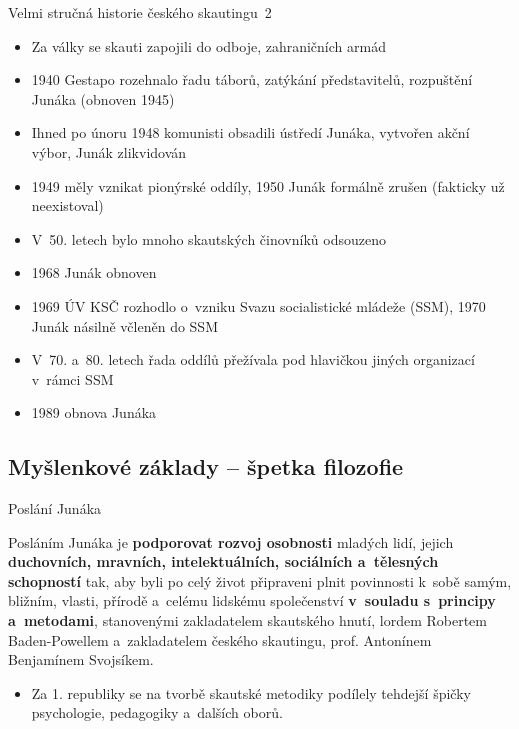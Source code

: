 \documentclass[compress,xelatex,xcolor=dvipsnames,print]{beamer}
\begin{document}
\begin{frame}{Velmi stručná historie českého skautingu~2}
\begin{itemize}
 \item Za války se skauti zapojili do odboje, zahraničních armád
 \item 1940 Gestapo rozehnalo řadu táborů, zatýkání představitelů, rozpuštění Junáka (obnoven 1945)
 \item Ihned po únoru 1948 komunisti obsadili ústředí Junáka, vytvořen akční výbor, Junák zlikvidován
 \item 1949 měly vznikat pionýrské oddíly, 1950 Junák formálně zrušen (fakticky už neexistoval)
 \item V~50. letech bylo mnoho skautských činovníků odsouzeno
 \item 1968 Junák obnoven
 \item 1969 ÚV KSČ rozhodlo o~vzniku Svazu socialistické mládeže (SSM), 1970 Junák násilně včleněn do SSM
 \item V~70. a~80. letech řada oddílů přežívala pod hlavičkou jiných organizací v~rámci SSM
 \item 1989 obnova Junáka
\end{itemize}
\end{frame}

\subsection{Myšlenkové základy -- špetka filozofie}

\begin{frame}{Poslání Junáka}
\begin{center}
\begin{Large}
Posláním Junáka je \textbf{podporovat rozvoj osobnosti} mladých lidí, jejich \textbf{duchovních, mravních, intelektuálních, sociálních a~tělesných schopností} tak, aby byli po celý život připraveni plnit povinnosti k~sobě samým, bližním, vlasti, přírodě a~celému lidskému společenství \textbf{v~souladu s~principy a~metodami}, stanovenými zakladatelem skautského hnutí, lordem Robertem Baden-Powellem a~zakladatelem českého skautingu, prof. Antonínem Benjamínem Svojsíkem.
\end{Large}
\end{center}
\begin{itemize}
\item Za 1. republiky se na tvorbě skautské metodiky podílely tehdejší špičky psychologie, pedagogiky a~dalších oborů.
\end{itemize}
\end{frame}
\end{document}
